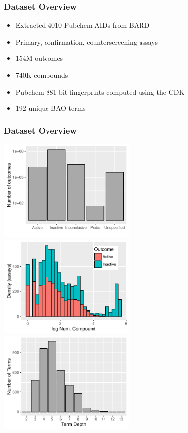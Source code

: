 \documentclass[anchorcolor=blue,linkcolor=blue]{beamer}
\begin{document}
\begin{frame}
  \frametitle{Dataset Overview}
  \begin{itemize}
  \item Extracted 4010 Pubchem AIDs from BARD
  \item Primary, confirmation, counterscreening assays
  \item 154M outcomes
  \item 740K compounds
  \item Pubchem 881-bit fingerprints computed using the CDK
  \item 192 unique BAO terms
  \end{itemize}
\end{frame}

\begin{frame}
  \frametitle{Dataset Overview}
  \begin{center}
  \includegraphics[width=0.5\textwidth]{img-bioassay-outcomes} 
  \includegraphics[width=0.5\textwidth]{img-outcomehistogram} \\
  \includegraphics[width=0.5\textwidth]{img-termdepth}

\end{center}
\end{frame}
\end{document}
